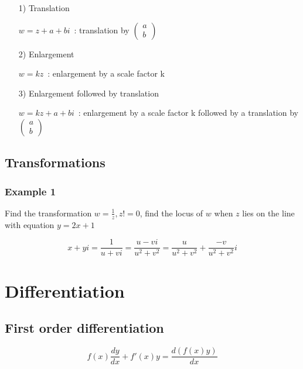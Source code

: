 \documentclass[a4paper,9pt]{scrartcl}
\begin{document}
    \begin{itemize}
        \item [1)] Translation

        $w=z+a+bi$\ : translation by
        $\begin{pmatrix}
             a \\b
        \end{pmatrix}$

        \item [2)] Enlargement

        $w=kz$\ : enlargement by a scale factor k

        \item [3)] Enlargement followed by translation

        $w=kz+a+bi$\ : enlargement by a scale factor k followed by a translation by
        $\begin{pmatrix}
             a \\b
        \end{pmatrix}$
    \end{itemize}

    \subsection{Transformations}

    \subsubsection{Example 1}
    Find the transformation $w = \frac{1}{z}, z != 0$, find the locus of $w$ when $z$ lies on the line with equation $y = 2x + 1$

    \begin{displaymath}
        x + yi = \frac{1}{u + vi} = \frac{u - vi}{u^2 + v^2} = \frac{u}{u^2+v^2} + \frac{-v}{u^2+v^2}i
    \end{displaymath}


    \section{Differentiation}

    \subsection{First order differentiation}

    \begin{displaymath}
        f(x) \frac{dy}{dx} + f'(x) y = \frac{d(f(x) y )}{dx}
    \end{displaymath}
\end{document}
